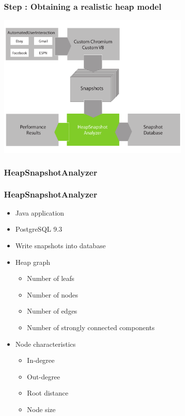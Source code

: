 \begin{frame}
	\frametitle{Step \theStepCounter: Obtaining a realistic heap model}		
	\includegraphics[width=26em]{../imgs/solution_h_3.pdf}
\end{frame}
	
\subsubsection{HeapSnapshotAnalyzer}
\begin{frame}
	\frametitle{HeapSnapshotAnalyzer}
	\begin{itemize}
		\item Java application
		\item PostgreSQL 9.3
		\item Write snapshots into database
			
		\pause
			
		\item Heap graph
		\begin{itemize}
			 \item Number of leafs
			 \item Number of nodes
			 \item Number of edges
			 \item Number of strongly connected components
		\end{itemize}
			
		\pause 
			
		\item Node characteristics
		\begin{itemize} 
			 \item In-degree
			 \item Out-degree
			 \item Root distance
			 \item Node size 
		\end{itemize}
	\end{itemize} 
\end{frame}
	
